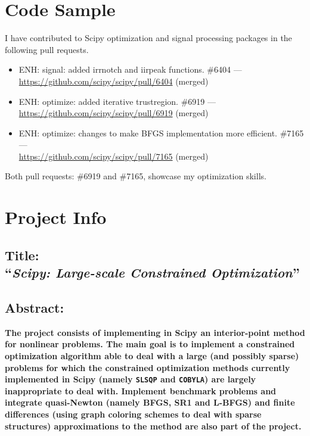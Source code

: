 \documentclass[11pt]{article}
\begin{document}
\section*{Code Sample}

I have contributed to Scipy optimization and signal processing packages in the following
pull requests. 

\begin{itemize}
  \item
    ENH: signal: added irrnotch and iirpeak functions. \#6404 --- \\
    \href{https://github.com/scipy/scipy/pull/6404}{https://github.com/scipy/scipy/pull/6404}
    (merged)
  \item
    ENH: optimize: added iterative trustregion. \#6919 --- \\
    \href{https://github.com/scipy/scipy/pull/6919}{https://github.com/scipy/scipy/pull/6919}
    (merged)
  \item
    ENH: optimize: changes to make BFGS implementation more efficient. \#7165 --- \\
    \href{https://github.com/scipy/scipy/pull/7165}{https://github.com/scipy/scipy/pull/7165}
    (merged)
\end{itemize}

\noindent
Both pull requests: \#6919 and  \#7165, showcase my optimization skills.

\newpage
\section*{Project Info}

\subsection*{Title: \\``\textit{Scipy: Large-scale Constrained Optimization}''}

\subsection*{Abstract:}


\textbf{\noindent
  The project consists of implementing in Scipy an interior-point
  method for nonlinear problems. The main goal is to implement
  a constrained optimization algorithm able to deal with a large
  (and possibly sparse) problems for which the constrained optimization methods currently
  implemented in Scipy (namely \texttt{SLSQP} and \texttt{COBYLA}) are
  largely inappropriate to deal with. Implement benchmark problems and
  integrate quasi-Newton (namely BFGS, SR1 and L-BFGS)
  and finite differences (using graph coloring schemes to deal with sparse structures)
  approximations to the method are also part of the project.}
\end{document}
